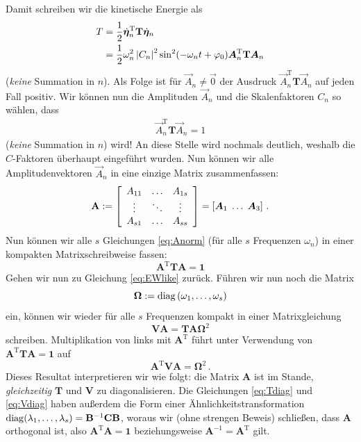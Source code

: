 \documentclass[paper=a4, fontsize=11.0pt, abstractoff, DIV12]{scrartcl}
\begin{document}
Damit schreiben wir die kinetische Energie als
\begin{align}
T &= \frac{1}{2}\dot{{\boldsymbol{\eta}}}_n^\mathrm{T} \mathbf{T} \dot{{\boldsymbol{\eta}}}_n\nonumber\\
&= \frac{1}{2} \omega_n^2 \left\vert C_n \right\vert^2 \sin^2(-\omega_n t +\varphi_0) {\boldsymbol{A}}^\mathrm{T}_n\mathbf{T}{\boldsymbol{A}}_n
\end{align}
(\emph{keine} Summation in $n$).
Als Folge ist für $\vec{A}_n \ne \vec 0$ der Ausdruck $\vec
A^\mathrm{T}_n\mathbf{T}\vec{A}_n$ auf jeden Fall positiv. Wir können nun
die Amplituden $\vec{A}_n$ und die Skalenfaktoren $C_n$ so wählen, dass
\begin{align}
\vec A^\mathrm{T}_n\mathbf{T}\vec{A}_n = 1
\label{eq:Anorm}
\end{align}
(\emph{keine} Summation in $n$) wird! An diese Stelle wird nochmals deutlich, weshalb die $C$-Faktoren
überhaupt eingeführt wurden. Nun können wir alle Amplitudenvektoren $\vec
A_n$ in eine einzige Matrix zusammenfassen:
\begin{equation}
\mathbf{A} := \threeMatrix{A_{11}}{\dots}{A_{1s}}{\vdots}{\ddots}{\vdots}{A_{s1}}{\dots}{A_{ss}} = \left[\vec A_1\; \dots\;\vec A_3\right]\,.
\label{eq:AMatrix}
\end{equation}
Nun können wir alle $s$ Gleichungen \eqref{eq:Anorm} (für alle $s$ Frequenzen
$\omega_n$) in einer kompakten Matrixschreibweise fassen:
\begin{equation}
\mathbf{A}^\mathrm{T} \mathbf{T} \mathbf{A} = \mathbf{1}
\label{eq:Tdiag}
\end{equation}
Gehen wir nun zu Gleichung \eqref{eq:EWlike} zurück. Führen wir nun noch die
Matrix
\begin{equation}
\mathbf{\Omega} := \operatorname{diag}\left(\omega_1, \dots,\omega_s\right)
\end{equation}
ein, können wir wieder für alle $s$ Frequenzen kompakt in einer Matrixgleichung
\begin{equation}
\mathbf{V}\mathbf{A} = \mathbf{T}\mathbf{A}\mathbf{\Omega}^2
\end{equation}
schreiben. Multiplikation von links mit $\mathbf{A}^\mathrm{T}$ führt
unter Verwendung von $\mathbf{A}^\mathrm{T}\mathbf{T}\mathbf{A}=\mathbf{1}$ auf
\begin{equation}
\mathbf{A}^\mathrm{T}\mathbf{V}\mathbf{A} = \mathbf{\Omega}^2\,.
\label{eq:Vdiag}
\end{equation}
Dieses Resultat interpretieren wir wie folgt: die Matrix $\mathbf{A}$ ist im
Stande, \emph{gleichzeitig} $\mathbf{T}$ und $\mathbf{V}$ zu
diagonalisieren. Die Gleichungen \eqref{eq:Tdiag} und \eqref{eq:Vdiag} haben
außerdem die Form einer Ähn\-lich\-keits\-trans\-for\-mation
$\operatorname{diag}(\lambda_1,\dots,\lambda_s) = \mathbf{B}^{-1}\mathbf{C}\mathbf{B}$,
woraus wir (ohne strengen Beweis) schließen, dass $\mathbf{A}$ orthogonal
ist, also $\mathbf{A}^\mathrm{T}\mathbf{A}=\mathbf{1}$ beziehungsweise
$\mathbf{A}^{-1} = \mathbf{A}^{\mathrm{T}}$ gilt.
\end{document}
